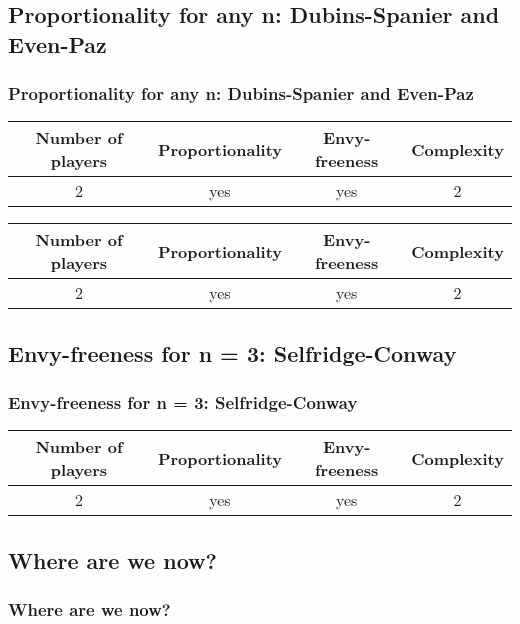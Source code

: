 \documentclass{beamer}
\begin{document}
\subsection{Proportionality for any n: Dubins-Spanier and Even-Paz}
\begin{frame}
\frametitle{Proportionality for any n: Dubins-Spanier and Even-Paz}
\begin{table}
\begin{tabular}{c|c|c|c|}
Number of players & Proportionality & Envy-freeness & Complexity \\
\hline 
2 & yes & yes & 2 \\
\end{tabular}
\end{table}

\begin{table}
\begin{tabular}{c|c|c|c|}
Number of players & Proportionality & Envy-freeness & Complexity \\
\hline 
2 & yes & yes & 2 \\
\end{tabular}
\end{table}

\end{frame}

\subsection{Envy-freeness for n = 3: Selfridge-Conway}
\begin{frame}
\frametitle{Envy-freeness for n = 3: Selfridge-Conway}
\begin{table}
\begin{tabular}{c|c|c|c|}
Number of players & Proportionality & Envy-freeness & Complexity \\
\hline 
2 & yes & yes & 2 \\
\end{tabular}
\end{table}

\end{frame}

\subsection{Where are we now?}
\begin{frame}
\frametitle{Where are we now?}
\end{frame}

\end{document}
